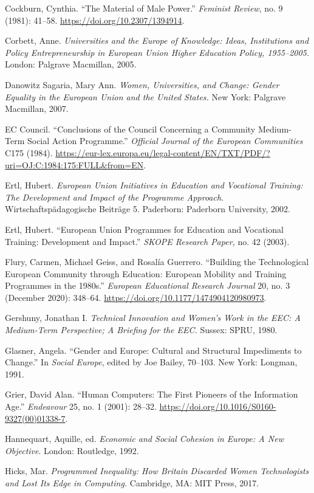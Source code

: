 \documentclass{tufte-handout}
\begin{document}
\begin{hangparas}{.25in}{1}
Cockburn, Cynthia. ``The Material of Male Power.'' \emph{Feminist
Review}, no. 9 (1981): 41--58. \url{https://doi.org/10.2307/1394914}.

Corbett, Anne. \emph{Universities and the Europe of Knowledge: Ideas,
Institutions and Policy Entrepreneurship in European Union Higher
Education Policy, 1955--2005.} London: Palgrave Macmillan, 2005.

Danowitz Sagaria, Mary Ann. \emph{Women, Universities, and Change:
Gender Equality in the European Union and the United States.} New York:
Palgrave Macmillan, 2007.

EC Council. ``Conclusions of the Council Concerning a Community
Medium-Term Social Action Programme.'' \emph{Official Journal of the
European Communities} C175 (1984).
\url{https://eur-lex.europa.eu/legal-content/EN/TXT/PDF/?uri=OJ:C:1984:175:FULL\&from=EN}.

Ertl, Hubert. \emph{European Union Initiatives in Education and
Vocational Training: The Development and Impact of the Programme
Approach}. Wirtschaftspädagogische Beiträge 5. Paderborn: Paderborn
University, 2002.

Ertl, Hubert. ``European Union Programmes for Education and Vocational
Training: Development and Impact.'' \emph{SKOPE Research Paper,} no. 42
(2003).

Flury, Carmen, Michael Geiss, and Rosalía Guerrero. ``Building the
Technological European Community through Education: European Mobility
and Training Programmes in the 1980s.'' \emph{European Educational
Research Journal} 20, no. 3 (December 2020): 348--64.
\url{https://doi.org/10.1177/1474904120980973}.

Gershuny, Jonathan I. \emph{Technical Innovation and Women's Work in the
EEC: A Medium-Term Perspective; A Briefing for the EEC.} Sussex: SPRU,
1980.

Glasner, Angela. ``Gender and Europe: Cultural and Structural
Impediments to Change.'' In \emph{Social Europe}, edited by Joe Bailey,
70--103. New York: Longman, 1991.

Grier, David Alan. ``Human Computers: The First Pioneers of the
Information Age.'' \emph{Endeavour} 25, no. 1 (2001): 28--32.
\url{https://doi.org/10.1016/S0160-9327(00)01338-7}.

Hannequart, Aquille, ed. \emph{Economic and Social Cohesion in Europe: A
New Objective}. London: Routledge, 1992.

Hicks, Mar. \emph{Programmed Inequality: How Britain} \emph{Discarded
Women Technologists and Lost Its Edge in Computing.} Cambridge, MA: MIT
Press, 2017.


\end{hangparas}
\end{document}
